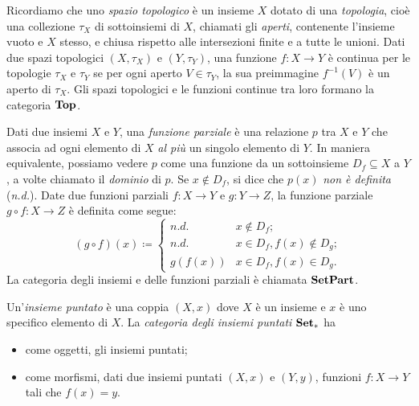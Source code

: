 \begin{example}\label{ex_cat_top}
	Ricordiamo che uno \emph{spazio topologico} è un insieme \(X\) dotato di una \emph{topologia}, cioè una collezione $\tau_X$ di sottoinsiemi di \(X\), chiamati gli \emph{aperti}, contenente l'insieme vuoto e \(X\) stesso, e chiusa rispetto alle intersezioni finite e a tutte le unioni. 
	Dati due spazi topologici \((X,\tau_X)\) e \((Y,\tau_Y)\), una funzione \(f:X\to Y\) è continua per le topologie \(\tau_X\) e \(\tau_Y\) se per ogni aperto \(V\in\tau_Y\), la sua preimmagine \(f^{-1}(V)\) è un aperto di \(\tau_X\).
	Gli spazi topologici e le funzioni continue tra loro formano la categoria \(\mathbf{Top}\).
\end{example}
\begin{example}\label{ex_cat_pfun}
	Dati due insiemi \(X\) e \(Y\), una \emph{funzione parziale} è una relazione \(p\) tra \(X\) e \(Y\) che associa ad ogni elemento di \(X\) \emph{al più} un singolo elemento di \(Y\). In maniera equivalente, possiamo vedere \(p\) come una funzione da un sottoinsieme \(D_f\subseteq X\) a \(Y\), a volte chiamato il \emph{dominio} di \(p\). Se \(x\notin D_f\), si dice che \(p(x)\) \emph{non è definita} (\emph{n.d.}).
	Date due funzioni parziali \(f:X\to Y\) e \(g:Y\to Z\), la funzione parziale \(g\circ f:X\to Z\) è definita come segue:
	\[
	(g\circ f) (x) \coloneqq \begin{cases}
								n.d. & x\notin D_f ; \\
								n.d. & x\in D_f, f(x)\notin D_g ; \\
								g(f(x)) & x\in D_f, f(x)\in D_g .
							 \end{cases}
	\]
	La categoria degli insiemi e delle funzioni parziali è chiamata \(\mathbf{SetPart}\).
\end{example}
\begin{example}\label{ex_cat_puntati}
	Un'\emph{insieme puntato} è una coppia \((X,x)\) dove \(X\) è un insieme e \(x\) è uno specifico elemento di \(X\).
	La \emph{categoria degli insiemi puntati} \(\mathbf{Set}_*\) ha
	\begin{itemize}
		\item come oggetti, gli insiemi puntati;
		\item come morfismi, dati due insiemi puntati \((X,x)\) e \((Y,y)\), funzioni \(f:X\to Y\) tali che \(f(x)=y\).
	\end{itemize}
\end{example}
